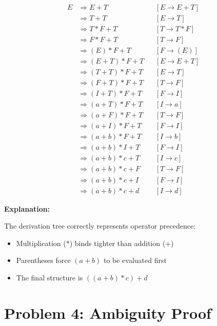 \documentclass[12pt]{article}
\begin{document}
\begin{align*}
E &\Rightarrow E + T                    && [E \to E + T] \\
  &\Rightarrow T + T                    && [E \to T] \\
  &\Rightarrow T * F + T                && [T \to T * F] \\
  &\Rightarrow F * F + T                && [T \to F] \\
  &\Rightarrow (E) * F + T              && [F \to (E)] \\
  &\Rightarrow (E + T) * F + T          && [E \to E + T] \\
  &\Rightarrow (T + T) * F + T          && [E \to T] \\
  &\Rightarrow (F + T) * F + T          && [T \to F] \\
  &\Rightarrow (I + T) * F + T          && [F \to I] \\
  &\Rightarrow (a + T) * F + T          && [I \to a] \\
  &\Rightarrow (a + F) * F + T          && [T \to F] \\
  &\Rightarrow (a + I) * F + T          && [F \to I] \\
  &\Rightarrow (a + b) * F + T          && [I \to b] \\
  &\Rightarrow (a + b) * I + T          && [F \to I] \\
  &\Rightarrow (a + b) * c + T          && [I \to c] \\
  &\Rightarrow (a + b) * c + F          && [T \to F] \\
  &\Rightarrow (a + b) * c + I          && [F \to I] \\
  &\Rightarrow (a + b) * c + d          && [I \to d]
\end{align*}

\textbf{Explanation:}

The derivation tree correctly represents operator precedence:
\begin{itemize}
\item Multiplication ($*$) binds tighter than addition ($+$)
\item Parentheses force $(a + b)$ to be evaluated first
\item The final structure is $((a + b) * c) + d$
\end{itemize}


\section{Problem 4: Ambiguity Proof}
\end{document}
